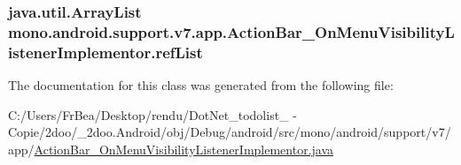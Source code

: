 \hypertarget{classmono_1_1android_1_1support_1_1v7_1_1app_1_1_action_bar___on_menu_visibility_listener_implementor_daba891c34398ac9f06754bddad7276f}{
\subsubsection[{refList}]{\setlength{\rightskip}{0pt plus 5cm}java.util.ArrayList {\bf mono.android.support.v7.app.ActionBar\_\-OnMenuVisibilityListenerImplementor.refList}}}
\label{classmono_1_1android_1_1support_1_1v7_1_1app_1_1_action_bar___on_menu_visibility_listener_implementor_daba891c34398ac9f06754bddad7276f}




The documentation for this class was generated from the following file:\begin{CompactItemize}
\item 
C:/Users/FrBea/Desktop/rendu/DotNet\_\-todolist\_ - Copie/2doo/\_\-2doo.Android/obj/Debug/android/src/mono/android/support/v7/app/\hyperlink{_action_bar___on_menu_visibility_listener_implementor_8java}{ActionBar\_\-OnMenuVisibilityListenerImplementor.java}\end{CompactItemize}
